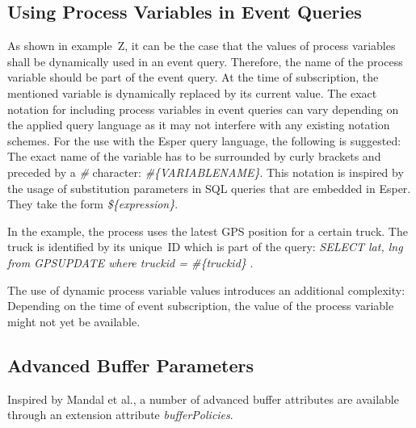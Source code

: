 \subsection{Using Process Variables in Event Queries}



As shown in example~Z, it can be the case that the values of process variables shall be dynamically used in an event query.
Therefore, the name of the process variable should be part of the event query. At the time of subscription, the mentioned variable is dynamically replaced by its current value.
The exact notation for including process variables in event queries can vary depending on the applied query language as it may not interfere with any existing notation schemes.
For the use with the Esper query language, the following is suggested: The exact name of the variable has to be surrounded by curly brackets and preceded by a \textit{\#} character: \textit{\#\{VARIABLENAME\}}.
This notation is inspired by the usage of substitution parameters in SQL queries that are embedded in Esper. They take the form \textit{\$\{expression\}}.

In the example, the process uses the latest GPS position for a certain truck. The truck is identified by its unique~ID which is part of the query: \textit{SELECT lat, lng from GPSUPDATE where truckid = \#\{truckid\} }.

The use of dynamic process variable values introduces an additional complexity: Depending on the time of event subscription, the value of the process variable might not yet be available.


\subsection{Advanced Buffer Parameters}\label{ch:bpmnx:bufferpolicies}
Inspired by Mandal et al., a number of advanced buffer attributes are available through an extension attribute \textit{bufferPolicies}.

